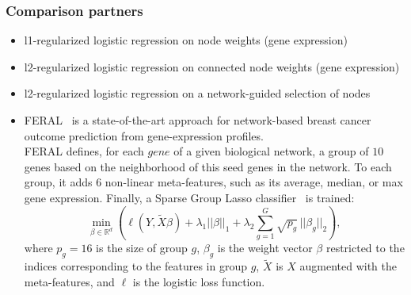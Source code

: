 \documentclass{bioinfo}
\newcommand{\xmat}{X}
\begin{document}
\begin{methods}
\subsubsection{Comparison partners}
\begin{itemize}
\item l1-regularized logistic regression on node weights (gene expression)
\item l2-regularized logistic regression on connected node weights (gene expression)
\item l2-regularized logistic regression on a network-guided selection of nodes
\item FERAL~\cite{allahyar2015} is a state-of-the-art approach for network-based breast cancer outcome prediction from gene-expression profiles.\\
FERAL defines, for each $gene$ of a given biological network, a group of $10$ genes based on the neighborhood of this seed genes in the network. To each group, it adds $6$ non-linear meta-features, such as its average, median, or max gene expression. Finally, a Sparse Group Lasso classifier~\cite{friedman2010} is trained:
  \[
  \min_{\beta \in \mathbb{R}^d} \left( \ell(Y, \tilde \xmat  \beta) + \lambda_1 || \beta||_1 + 
  \lambda_2 \sum_{g=1}^G \sqrt{p_g}\, ||\beta_g||_2 \right),
  \]
  where $p_g = 16$ is the size of group $g$, 
  $\beta_g$ is the weight vector $\beta$ restricted to the indices 
  corresponding to the features in group $g$, 
  $\tilde \xmat$ is $\xmat$ augmented with the meta-features,
  and $\ell$ is the logistic loss function.

\end{itemize}




\enlargethispage{6pt}



\end{methods}
\end{document}
